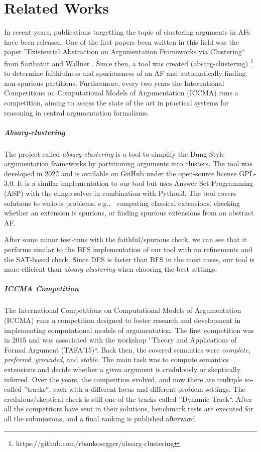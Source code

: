 \chapter{Related Works}
In recent years, publications targetting the topic of clustering arguments in AFs have been released. One of the first papers been written in this field was the paper ''Existential Abstraction on Argumentation Frameworks via Clustering`` from Saribatur and Wallner \cite{DBLP:conf/kr/SaribaturW21}. Since then, a tool was created (absarg-clustering) \footnote{https://github.com/rbankosegger/absarg-clustering} to determine faithfulness and spuriousness of an AF and automatically finding non-spurious partitions. Furthermore, every two years the International Competitions on Computational Models of Argumentation (ICCMA) \cite{COMP:ICCMA2023} runs a competition, aiming to assess the state of the art in practical systems for reasoning in central argumentation formalisms.

\paragraph{Absarg-clustering} The project called \emph{absarg-clustering} is a tool to simplify the Dung-Style argumentation frameworks by partitioning arguments into clusters. The tool was developed in 2022 and is available on GitHub under the open-source license GPL-3.0. It is a similar implementation to our tool but uses Answer Set Programming (ASP) with the clingo solver \cite{gebser_et_al:OASIcs.ICLP.2016.2} in combination with Python3. The tool covers solutions to various problems, e.g., \ computing classical extensions, checking whether an extension is spurious, or finding spurious extensions from an abstract AF.

After some minor test-runs with the faithful/spurious check, we can see that it performs similar to the BFS implementation of our tool with no refinements and the SAT-based check. Since DFS is faster than BFS in the most cases, our tool is more efficient than \emph{absarg-clustering} when choosing the best settings.


\paragraph{ICCMA Competition} The International Competitions on Computational Models of Argumentation (ICCMA) runs a competition designed to foster research and development in implementing computational models of argumentation. The first competition was in 2015 and was associated with the workshop ''Theory and Applications of Formal Argument (TAFA'15)``. Back then, the covered semantics were \emph{complete}, \emph{preferred}, \emph{grounded}, and \emph{stable}. The main task was to compute semantics extensions and decide whether a given argument is credulously or skeptically inferred. Over the years, the competition evolved, and now there are multiple so-called ''tracks``, each with a different focus and different problem settings. The credulous/skeptical check is still one of the tracks called ''Dynamic Track``. After all the competitors have sent in their solutions, benchmark tests are executed for all the submissions, and a final ranking is published afterward.

